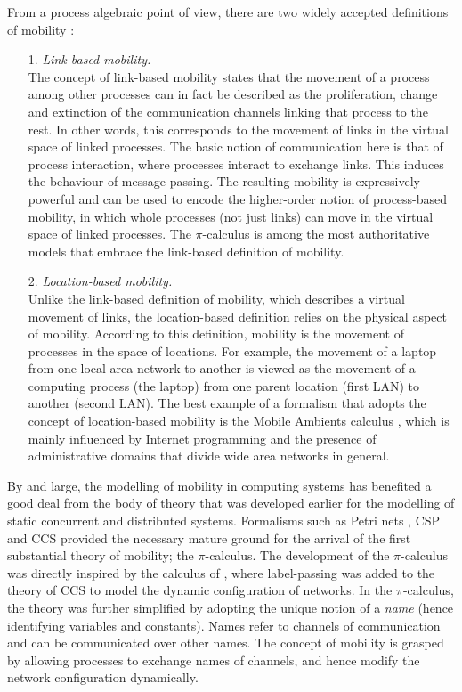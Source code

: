 \documentclass[10pt,a4paper,final,oneside,fleqn]{book}
\begin{document}
From a process algebraic point of view, there are two widely accepted definitions of mobility \cite{milner2}:
\begin{itemize}
\item[1.]
{\itshape Link-based mobility.\/}\\
The concept of link-based mobility states that the movement of a process among other processes can in fact be described as the proliferation, change and extinction of the communication channels linking that process to the rest.  In other words, this corresponds to the movement of links in the virtual space of linked processes.  The basic notion of communication here is that of process interaction, where processes interact to exchange links.  This induces the behaviour of message passing.  The resulting mobility is expressively powerful and can be used to encode the higher-order notion of process-based mobility, in which whole processes (not just links) can move in the virtual space of linked processes.  The $\pi$-calculus \cite{milner1,milner2,sangiorgi1} is among the most authoritative models that embrace the link-based definition of mobility.
\item[2.]{\itshape Location-based mobility.\/}\\
Unlike the link-based definition of mobility, which describes a virtual movement of links, the location-based definition relies on the physical aspect of mobility.  According to this definition, mobility is the movement of processes in the space of locations.  For example, the movement of a laptop from one local area network to another is viewed as the movement of a computing process (the laptop) from one parent location (first LAN) to another (second LAN). The best example of a formalism that adopts the concept of location-based mobility is the Mobile Ambients calculus \cite{cardelli1}, which is mainly influenced by Internet programming and the presence of administrative domains that divide wide area networks in general.
\end{itemize}
By and large, the modelling of mobility in computing systems has benefited a good deal from the body of theory that was developed earlier for the modelling of static concurrent and distributed systems.  Formalisms such as Petri nets \cite{petri1}, CSP \cite{hoare1} and CCS \cite{milner3} provided the necessary mature ground for the arrival of the first substantial theory of mobility; the $\pi$-calculus.
The development of the $\pi$-calculus was directly inspired by the calculus of \cite{engberg1}, where label-passing was added to the theory of CCS to model the dynamic configuration of networks.  In the $\pi$-calculus, the theory was further simplified by adopting the unique notion of a {\itshape name\/} (hence identifying variables and constants).  Names refer to channels of communication and can be communicated over other names.  The concept of mobility is grasped by allowing processes to exchange names of channels, and hence modify the network configuration dynamically.
 
\end{document}
